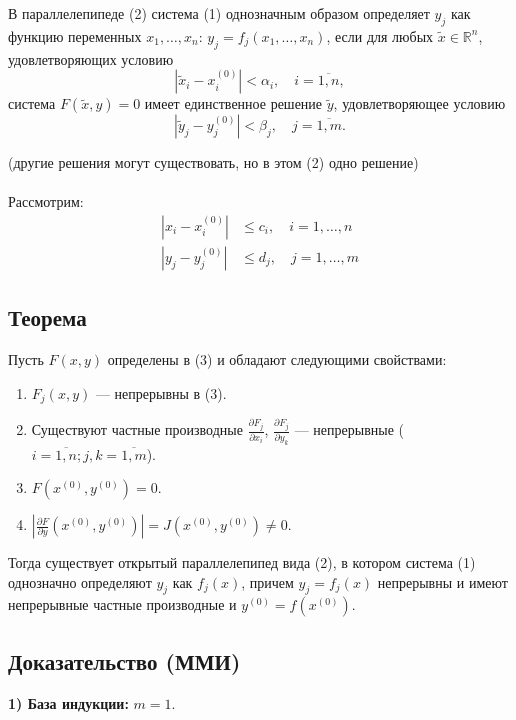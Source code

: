 \documentclass{article}
\begin{document}
В параллелепипеде (2) система (1) однозначным образом определяет $y_j$ как функцию переменных $x_1, \dots, x_n$: $y_j = f_j(x_1, \dots, x_n)$, если для любых $\widetilde{x} \in \mathbb{R}^n$, удовлетворяющих условию
\[
|\widetilde{x}_i - x_i^{(0)}| < \alpha_i, \quad i = \overline{1,n},
\]
система $F(\widetilde{x}, y) = 0$ имеет единственное решение $\widetilde{y}$, удовлетворяющее условию
\[
|\widetilde{y}_j - y_j^{(0)}| < \beta_j, \quad j = \overline{1,m}.
\]

(другие решения могут существовать, но в этом (2) одно решение)
\\\\

Рассмотрим: 
\begin{equation}
\begin{aligned}
|x_i - x_i^{(0)}| & \leq c_i, \quad i = 1, \dots, n \\
|y_j - y_j^{(0)}| & \leq d_j, \quad j = 1, \dots, m
\end{aligned}
\tag{3}
\end{equation}
\subsection*{\textbf{Теорема}}

Пусть $F(x,y)$ определены в (3) и обладают следующими свойствами:

\begin{enumerate}
\item $F_j(x,y)$ — непрерывны в (3).
\item Существуют частные производные $\frac{\partial F_j}{\partial x_i}$, $\frac{\partial F_j}{\partial y_k}$ — непрерывные ($i = \overline{1,n}; j,k = \overline{1,m}$).
\item $F(x^{(0)}, y^{(0)}) = 0$.
\item $\left| \frac{\partial F}{\partial y}(x^{(0)}, y^{(0)}) \right| = J(x^{(0)}, y^{(0)}) \neq 0$.
\end{enumerate}

Тогда существует открытый параллелепипед вида (2), в котором система (1) однозначно определяют $y_j$ как $f_j(x)$, причем $y_j = f_j(x)$ непрерывны и имеют непрерывные частные производные и $y^{(0)} = f(x^{(0)})$.

\subsection*{Доказательство (ММИ)}

\textbf{1) База индукции:} $m=1$.
\end{document}
